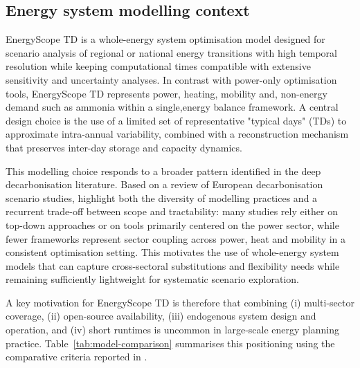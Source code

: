 \documentclass{article}
\begin{document}
\subsection{Energy system modelling context}
EnergyScope TD is a whole-energy system optimisation model designed for scenario analysis of regional or national energy transitions with high temporal resolution while keeping computational times compatible with extensive sensitivity and uncertainty analyses. In contrast with power-only optimisation tools, EnergyScope TD represents power, heating, mobility and, non-energy demand such as ammonia within a single,energy balance framework. A central design choice is the use of a limited set of representative "typical days" (TDs) to approximate intra-annual variability, combined with a reconstruction mechanism that preserves inter-day storage and capacity dynamics.

This modelling choice responds to a broader pattern identified in the deep decarbonisation literature. Based on a review of European decarbonisation scenario studies, \citet{borasioDeepDecarbonisationRegional2022} highlight both the diversity of modelling practices and a recurrent trade-off between scope and tractability: many studies rely either on top-down approaches or on tools primarily centered on the power sector, while fewer frameworks represent sector coupling across power, heat and mobility in a consistent optimisation setting. This motivates the use of whole-energy system models that can capture cross-sectoral substitutions and flexibility needs while remaining sufficiently lightweight for systematic scenario exploration.

A key motivation for EnergyScope TD is therefore that combining (i) multi-sector coverage, (ii) open-source availability, (iii) endogenous system design and operation, and (iv) short runtimes is uncommon in large-scale energy planning practice. Table~\ref{tab:model-comparison} summarises this positioning using the comparative criteria reported in \citet{limpensEnergyScopeTDNovel2019}.
\end{document}

